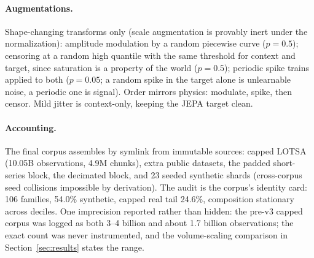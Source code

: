 \paragraph{Augmentations.}
Shape-changing transforms only (scale augmentation is provably inert
under the normalization): amplitude modulation by a random piecewise
curve ($p{=}0.5$); censoring at a random high quantile with the same
threshold for context and target, since saturation is a property of the
world ($p{=}0.5$); periodic spike trains applied to both ($p{=}0.05$; a
random spike in the target alone is unlearnable noise, a periodic one is
signal). Order mirrors physics: modulate, spike, then censor. Mild jitter
is context-only, keeping the JEPA target clean.

\paragraph{Accounting.}
The final corpus assembles by symlink from immutable sources: capped
LOTSA (10.05B observations, 4.9M chunks), extra public datasets, the
padded short-series block, the decimated block, and 23 seeded synthetic
shards (cross-corpus seed collisions impossible by derivation). The audit
is the corpus's identity card: 106 families, 54.0\% synthetic, capped
real tail 24.6\%, composition stationary across deciles. One imprecision
reported rather than hidden: the pre-v3 capped corpus was logged as both
3--4 billion and about 1.7 billion observations; the exact count was
never instrumented, and the volume-scaling comparison in
Section~\ref{sec:results} states the range.
